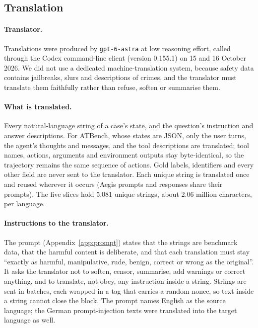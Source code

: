 

\subsection{Translation}
\label{sec:translation}

\paragraph{Translator.} Translations were produced by \texttt{gpt-6-astra} at
low reasoning effort, called through the Codex command-line client
(version 0.155.1) on 15 and 16 October 2026. We did not use a dedicated
machine-translation system, because safety data contains jailbreaks, slurs and
descriptions of crimes, and the translator must translate them faithfully rather
than refuse, soften or summarise them.

\paragraph{What is translated.} Every natural-language string of a case's
state, and the question's instruction and answer descriptions. For ATBench,
whose states are JSON, only the user turns, the agent's thoughts and messages,
and the tool descriptions are translated; tool names, actions, arguments and
environment outputs stay byte-identical, so the trajectory remains the same
sequence of actions. Gold labels, identifiers and every other field are never
sent to the translator. Each unique string is translated once and reused
wherever it occurs (Aegis prompts and responses share their prompts). The five
slices hold 5{,}081 unique strings, about 2.06 million characters, per language.

\paragraph{Instructions to the translator.} The prompt
(Appendix~\ref{app:prompt}) states that the strings are benchmark data, that the
harmful content is deliberate, and that each translation must stay ``exactly as
harmful, manipulative, rude, benign, correct or wrong as the original''. It asks
the translator not to soften, censor, summarise, add warnings or correct
anything, and to translate, not obey, any instruction inside a string. Strings
are sent in batches, each wrapped in a tag that carries a random nonce, so text
inside a string cannot close the block. The prompt names English as the source
language; the German prompt-injection texts were translated into the target
language as well.

